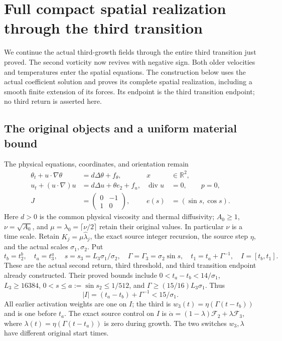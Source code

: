 \section{Full compact spatial realization through the third transition}
\label{tts:section}

We continue the actual third-growth fields through the entire third
transition just proved. The second vorticity now revives with negative
sign. Both older velocities and temperatures enter the spatial
equations. The construction below uses the actual coefficient solution
and proves its complete spatial realization, including a smooth finite
extension of its forces. Its endpoint is the third transition endpoint;
no third return is asserted here.

\subsection{The original objects and a uniform material bound}

The physical equations, coordinates, and orientation remain
\begin{align}\label{tts:PDE}
 \theta_t+u\cdot\nabla\theta&=d\Delta\theta+f_\theta,
 &x&\in\mathbb R^2,\nonumber\\
 u_t+(u\cdot\nabla)u&=d\Delta u+\theta e_2+f_u,
 &\operatorname{div}u&=0,\qquad p=0,\\
 J&=\begin{pmatrix}0&-1\\1&0\end{pmatrix},
 & e(s)&=(\sin s,\cos s).\nonumber
\end{align}
Here $d>0$ is the common physical viscosity and thermal diffusivity;
$A_0\geq1$, $\nu=\sqrt{A_0}$, and
$\mu=\lambda_0=\lceil\nu/2\rceil$ retain their original values.
In particular $\nu$ is a time scale. Retain
$K_j=\mu\widehat\lambda_j$, the exact source integer recursion,
the source step $\eta$, and the actual scales $\sigma_1,\sigma_2$.
Put
\begin{equation}\label{tts:times}
 t_b=t_2^b,\quad t_a=t_3^a,\quad
 s=s_3=L_3\sigma_1/\sigma_2,\quad
 \Gamma=\Gamma_3=\sigma_2\sin s,\quad
 t_1=t_a+\Gamma^{-1},\quad I=[t_b,t_1].
\end{equation}
These are the actual second return, third threshold, and third
transition endpoint already constructed. Their proved bounds include
$0<t_a-t_b<14/\sigma_1$, $L_3\geq16384$,
$0<s\leq a:=\sin s_2\leq1/512$, and
$\Gamma\geq(15/16)L_3\sigma_1$. Thus
\begin{equation}\label{tts:duration}
 |I|=(t_a-t_b)+\Gamma^{-1}<15/\sigma_1.
\end{equation}
All earlier activation weights are one on $I$; the third is
$w_3(t)=\eta(\Gamma(t-t_b))$ and is one before $t_a$.
The exact source control on $I$ is
$\dot\alpha=(1-\lambda)\mathcal F_2+\lambda\mathcal F_3$,
where $\lambda(t)=\eta(\Gamma(t-t_a))$ is zero during growth.
The two switches $w_3,\lambda$ have different original start times.

